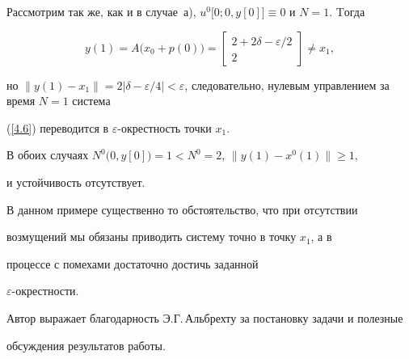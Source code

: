 \begin{exams}
Рассмотрим так же, как и в случае~а), $u^0\bigl[0; 0, y[0]\bigr]\equiv


0$ и $N=1$. Tогда


$$


y(1)=A\bigl(x_0+p(0)\bigr)=


\begin{bmatrix}2+2 \delta-\varepsilon/2\\2\end{bmatrix}


\ne x_1,


$$


но $\bigl\|y(1)-x_1\bigr\|=2|\delta-\varepsilon/4|<


\varepsilon$, следовательно, нулевым управлением за время $N=1$ система


(\ref{4.6}) переводится в $\varepsilon$-окрестность точки $x_1$.





В обоих случаях $N^0\bigl(0, y[0]\bigr)=1<N^0=2$, $\|y(1)-x^0(1)\|\ge 1$,


и устойчивость отсутствует. 


В данном примере существенно то обстоятельство, что при отсутствии 


возмущений мы обязаны приводить систему точно в точку $x_1$, а в


процессе с помехами достаточно достичь заданной


$\varepsilon$-окрестности.


\end{exams}





Автор выражает благодарность Э.Г.\,Альбрехту за постановку задачи и полезные


обсуждения результатов работы.








